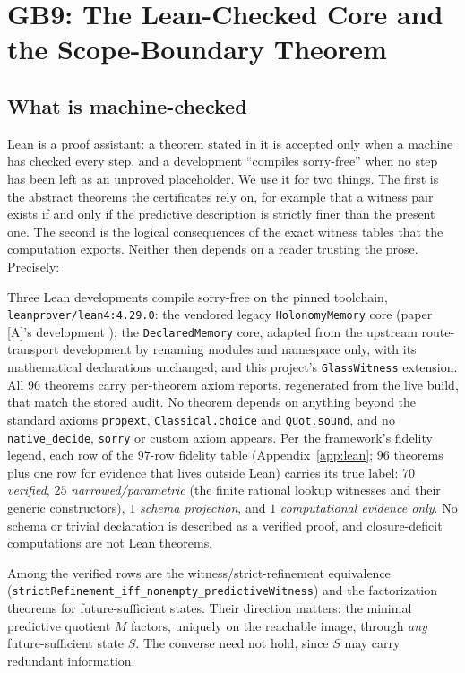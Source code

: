 \section{GB9: The Lean-Checked Core and the Scope-Boundary Theorem}
\label{sec:lean}

\subsection{What is machine-checked}

Lean \cite{de-moura-ullrich-2021} is a proof assistant: a theorem stated in it is accepted only
when a machine has checked every step, and a development ``compiles sorry-free'' when no step has
been left as an unproved placeholder. We use it for two things. The first is the abstract theorems
the certificates rely on, for example that a witness pair exists if and only if the predictive
description is strictly finer than the present one. The second is the logical consequences of the
exact witness tables that the computation exports. Neither then depends on a reader trusting the
prose. Precisely:

Three Lean developments compile sorry-free on the pinned toolchain,
\texttt{leanprover/\allowbreak{}lean4:4.29.0}: the vendored legacy \texttt{HolonomyMemory} core (paper [A]'s
development ); the \texttt{DeclaredMemory} core, adapted from the upstream
route-transport development by renaming modules and namespace only, with its mathematical
declarations unchanged; and this project's \texttt{GlassWitness} extension. All $96$ theorems carry
per-theorem axiom reports, regenerated from the live build, that match the stored audit. No
theorem depends on anything beyond the standard axioms \texttt{propext},
\texttt{Classical.choice} and \texttt{Quot.sound}, and no \texttt{native\_decide}, \texttt{sorry}
or custom axiom appears. Per the framework's fidelity legend, each row of the $97$-row fidelity
table (Appendix~\ref{app:lean}; $96$ theorems plus one row for evidence that lives outside Lean)
carries its true label: $70$ \emph{verified}, $25$ \emph{narrowed/parametric} (the finite rational
lookup witnesses and their generic constructors), $1$ \emph{schema projection}, and $1$
\emph{computational evidence only}. No schema or trivial declaration is described as a verified
proof, and closure-deficit computations are not Lean theorems.

Among the verified rows are the witness/strict-refinement equivalence
(\texttt{strictRefinement\_\allowbreak{}iff\_\allowbreak{}nonempty\_\allowbreak{}predictiveWitness}) and the factorization theorems for
future-sufficient states. Their direction matters: the minimal predictive quotient $M$ factors,
uniquely on the reachable image, through \emph{any} future-sufficient state $S$. The converse need
not hold, since $S$ may carry redundant information.

